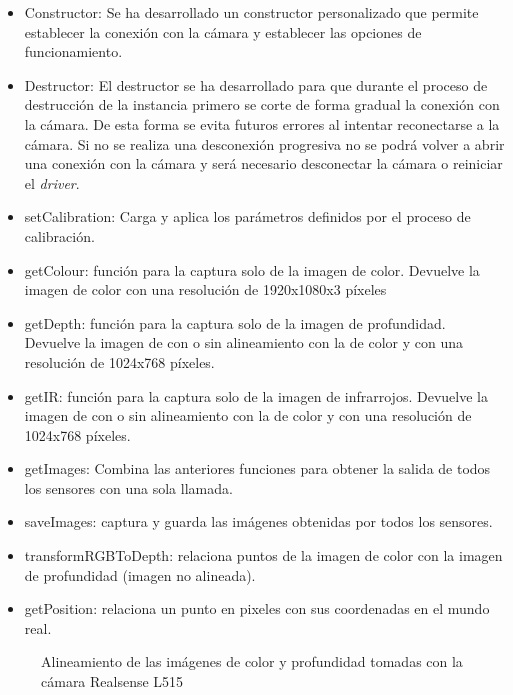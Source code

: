 \begin{itemize}
\item Constructor: Se ha desarrollado un constructor personalizado que permite establecer la conexión con la cámara y establecer las opciones de funcionamiento.
\item Destructor: El destructor se ha desarrollado para que durante el proceso de destrucción de la instancia primero se corte de forma gradual la conexión con la cámara. De esta forma se evita futuros errores al intentar reconectarse a la cámara. Si no se realiza una desconexión progresiva no se podrá volver a abrir una conexión con la cámara y será necesario desconectar la cámara o reiniciar el \textit{driver}.
\item setCalibration: Carga y aplica los parámetros definidos por el proceso de calibración.
\item getColour: función para la captura solo de la imagen de color. Devuelve la imagen de color con una resolución de 1920x1080x3 píxeles
\item getDepth: función para la captura solo de la imagen de profundidad. Devuelve la imagen de con o sin alineamiento con la de color y con una resolución de 1024x768 píxeles.
\item getIR: función para la captura solo de la imagen de infrarrojos. Devuelve la imagen de con o sin alineamiento con la de color y con una resolución de 1024x768 píxeles.
\item getImages: Combina las anteriores funciones para obtener la salida de todos los sensores con una sola llamada.
\item saveImages: captura y guarda las imágenes obtenidas por todos los sensores.
\item transformRGBToDepth: relaciona puntos de la imagen de color con la imagen de profundidad (imagen no alineada).
\item getPosition: relaciona un punto en pixeles con sus coordenadas en el mundo real.
\end{itemize}

\begin{figure}[ht]
  \hfill	
  \hfill	
\caption[Alineamiento de imágenes de color y profundidad]{Alineamiento de las imágenes de color y profundidad tomadas con la cámara Realsense L515}
\label{chap:Camara RGBD fig: Alineamiento}
\end{figure}